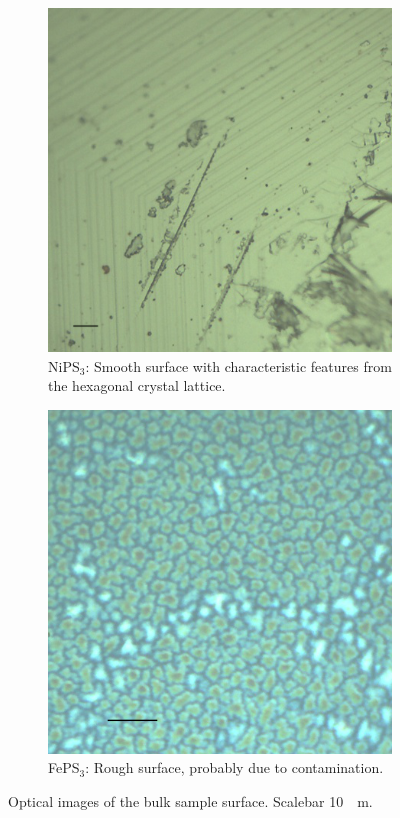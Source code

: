 \documentclass[
	twoside,
	parskip=half,
	a4paper,
]{scrbook}
\begin{document}
\begin{figure}
	\centering
	\begin{subfigure}[t]{.25\textwidth}
		\includegraphics[width=\textwidth]{../../data/2023-11-02/i005_NiPS3_50x-scalebar.png}
		\caption{NiPS$_3$: Smooth surface with characteristic features from the hexagonal crystal lattice.}
		\label{fig:bulk_nips3}
	\end{subfigure}
	\begin{subfigure}[t]{.25\textwidth}
		\includegraphics[width=\textwidth]{../../data/2023-11-02/i009_FePS3_100x-scalebar.png}
		\caption{FePS$_3$: Rough surface, probably due to contamination.}
		\label{fig:bulk_feps3}
	\end{subfigure}
	\caption{Optical images of the bulk sample surface. Scalebar \SI{10}{\mu m}.}	
\end{figure}
\end{document}

